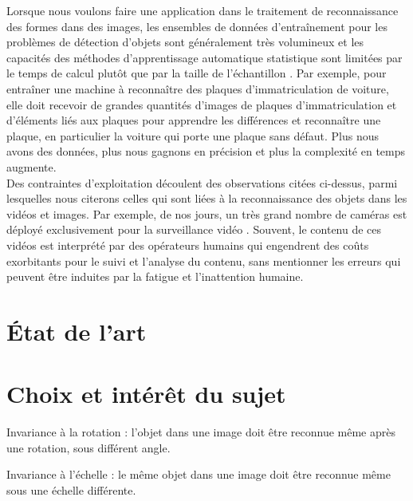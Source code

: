 		Lorsque nous voulons faire une application dans le traitement de reconnaissance des formes dans des images, les ensembles de données d'entraînement pour les  problèmes de détection d'objets sont généralement très volumineux et les capacités des méthodes d'apprentissage automatique statistique sont limitées par le temps de calcul plutôt que par la taille de l'échantillon \cite{bottou2010large}.
		Par exemple, pour entraîner une machine à reconnaître des plaques d'immatriculation de voiture, elle doit recevoir de grandes quantités d'images de plaques d'immatriculation et d'éléments liés aux plaques pour apprendre les différences et reconnaître une plaque, en particulier la voiture qui porte une plaque sans défaut. Plus nous avons des données, plus nous gagnons en précision et plus la complexité en temps augmente.\\
		Des contraintes d'exploitation découlent des observations citées ci-dessus, parmi lesquelles nous citerons celles qui sont liées à la reconnaissance des objets dans les vidéos et images. Par exemple, de nos jours, un très grand nombre de caméras est déployé exclusivement pour la surveillance vidéo \cite{ahadjitse2013reconnaissance}. Souvent, le contenu de ces vidéos est interprété par des opérateurs humains qui engendrent des coûts exorbitants pour le suivi et l'analyse du contenu, sans mentionner les erreurs qui peuvent être induites par la fatigue et l'inattention humaine. 
		
		
		
	\section{État de l’art}
	
	
	
	
	
		
	\section{Choix et intérêt du sujet}
		\begin{list}{--}{Les modèles entraînés doivent être invariants sous des transformations géométriques et qualités des objets observés.}
			\item Invariance à la rotation : l'objet dans une image doit être reconnue même après une rotation, sous  différent angle.
			\item Invariance à l'échelle : le même objet dans une image doit être reconnue même sous une échelle différente.
		\end{list}
		
